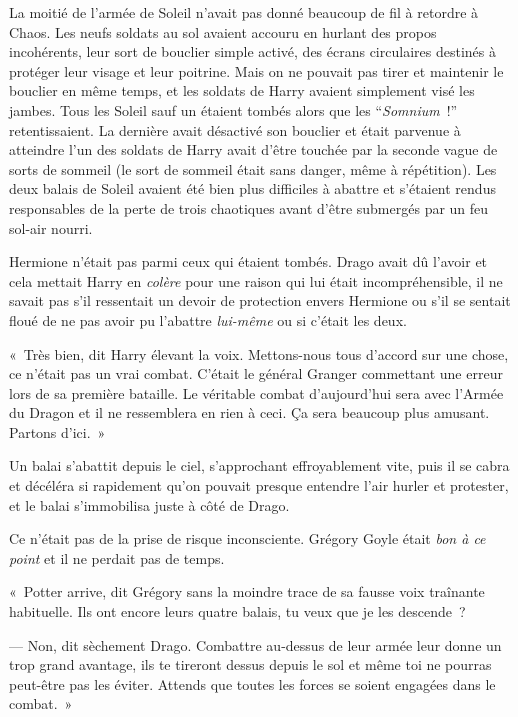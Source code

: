 La moitié de l'armée de Soleil n'avait pas donné beaucoup de fil à retordre à Chaos. Les neufs soldats au sol avaient accouru en hurlant des propos incohérents, leur sort de bouclier simple activé, des écrans circulaires destinés à protéger leur visage et leur poitrine. Mais on ne pouvait pas tirer et maintenir le bouclier en même temps, et les soldats de Harry avaient simplement visé les jambes. Tous les Soleil sauf un étaient tombés alors que les “\emph{Somnium}~!” retentissaient. La dernière avait désactivé son bouclier et était parvenue à atteindre l'un des soldats de Harry avait d'être touchée par la seconde vague de sorts de sommeil (le sort de sommeil était sans danger, même à répétition). Les deux balais de Soleil avaient été bien plus difficiles à abattre et s'étaient rendus responsables de la perte de trois chaotiques avant d'être submergés par un feu sol-air nourri.

Hermione n'était pas parmi ceux qui étaient tombés. Drago avait dû l'avoir et cela mettait Harry en \emph{colère} pour une raison qui lui était incompréhensible, il ne savait pas s'il ressentait un devoir de protection envers Hermione ou s'il se sentait floué de ne pas avoir pu l'abattre \emph{lui-même} ou si c'était les deux.

«~Très bien, dit Harry élevant la voix. Mettons-nous tous d'accord sur une chose, ce n'était pas un vrai combat. C'était le général Granger commettant une erreur lors de sa première bataille. Le véritable combat d'aujourd'hui sera avec l'Armée du Dragon et il ne ressemblera en rien à ceci. Ça sera beaucoup plus amusant. Partons d'ici.~»

\later

Un balai s'abattit depuis le ciel, s'approchant effroyablement vite, puis il se cabra et décéléra si rapidement qu'on pouvait presque entendre l'air hurler et protester, et le balai s'immobilisa juste à côté de Drago.

Ce n'était pas de la prise de risque inconsciente. Grégory Goyle était \emph{bon à ce point} et il ne perdait pas de temps.

«~Potter arrive, dit Grégory sans la moindre trace de sa fausse voix traînante habituelle. Ils ont encore leurs quatre balais, tu veux que je les descende~?

--- Non, dit sèchement Drago. Combattre au-dessus de leur armée leur donne un trop grand avantage, ils te tireront dessus depuis le sol et même toi ne pourras peut-être pas les éviter. Attends que toutes les forces se soient engagées dans le combat.~»

